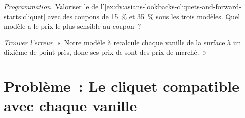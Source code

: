 \begin{exercise}[$\star\star\star$]\label{exo:dv:asians-lookbacks-cliquets-and-forward-starts:7}
\emph{Programmation.} Valoriser le  de l'\cref{ex:dv:asians-lookbacks-cliquets-and-forward-starts:cliquet} avec des coupons de
15~\% et 35~\% sous les trois modèles. Quel modèle a le prix le plus sensible au coupon~?
\end{exercise}

\begin{exercise}[$\star\star\star$]\label{exo:dv:asians-lookbacks-cliquets-and-forward-starts:8}
\emph{Trouver l'erreur.} «~Notre modèle à  recalcule chaque vanille de la surface à un dixième de point près, donc ses prix de
 sont des prix de marché.~»
\end{exercise}

\section{Problème~: Le cliquet compatible avec chaque vanille}

